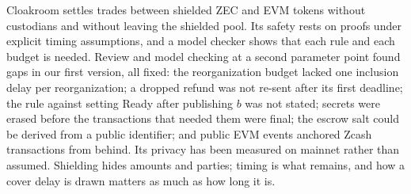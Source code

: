 \documentclass[10pt,letterpaper]{article}
\makeatletter
\renewcommand\section{\@startsection{section}{1}{\z@}{-1.3em}{0.45em}{\normalfont\large\bfseries}}
\theoremstyle{plain}
\theoremstyle{definition}
\makeatother
\begin{document}
\section{Conclusion}

Cloakroom settles trades between shielded ZEC and EVM tokens without custodians and without
leaving the shielded pool. Its safety rests on proofs under explicit timing assumptions, and a
model checker shows that each rule and each budget is needed. Review and model checking at a
second parameter point found gaps in our first version, all fixed: the reorganization budget
lacked one inclusion delay per reorganization; a dropped refund was not re-sent after its first
deadline; the rule against setting Ready after publishing $b$ was not stated; secrets were erased
before the transactions that needed them were final; the escrow salt could be derived from a
public identifier; and public EVM events anchored Zcash transactions from behind. Its
privacy has been measured on mainnet rather than assumed. Shielding hides amounts and parties;
timing is what remains, and how a cover delay is drawn matters as much as how long it is.
\end{document}
